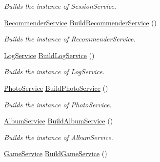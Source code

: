 \begin{DoxyCompactItemize}
\begin{DoxyCompactList}\small\item\em Builds the instance of Session\+Service. \end{DoxyCompactList}\item 
\hyperlink{classcom_1_1shephertz_1_1app42_1_1paas_1_1sdk_1_1csharp_1_1recommend_1_1_recommender_service}{Recommender\+Service} \hyperlink{classcom_1_1shephertz_1_1app42_1_1paas_1_1sdk_1_1csharp_1_1_service_a_p_i_a836d79a8d480ea93b53f6b70f61e899f}{Build\+Recommender\+Service} ()
\begin{DoxyCompactList}\small\item\em Builds the instance of Recommender\+Service. \end{DoxyCompactList}\item 
\hyperlink{classcom_1_1shephertz_1_1app42_1_1paas_1_1sdk_1_1csharp_1_1log_1_1_log_service}{Log\+Service} \hyperlink{classcom_1_1shephertz_1_1app42_1_1paas_1_1sdk_1_1csharp_1_1_service_a_p_i_a65188f775f1c72ccd4edd4dad1cd6b7e}{Build\+Log\+Service} ()
\begin{DoxyCompactList}\small\item\em Builds the instance of Log\+Service. \end{DoxyCompactList}\item 
\hyperlink{classcom_1_1shephertz_1_1app42_1_1paas_1_1sdk_1_1csharp_1_1gallery_1_1_photo_service}{Photo\+Service} \hyperlink{classcom_1_1shephertz_1_1app42_1_1paas_1_1sdk_1_1csharp_1_1_service_a_p_i_a3497410caec84d9ac88efb0968af15a0}{Build\+Photo\+Service} ()
\begin{DoxyCompactList}\small\item\em Builds the instance of Photo\+Service. \end{DoxyCompactList}\item 
\hyperlink{classcom_1_1shephertz_1_1app42_1_1paas_1_1sdk_1_1csharp_1_1gallery_1_1_album_service}{Album\+Service} \hyperlink{classcom_1_1shephertz_1_1app42_1_1paas_1_1sdk_1_1csharp_1_1_service_a_p_i_a9e164a55b12db3e5d4053a716c513859}{Build\+Album\+Service} ()
\begin{DoxyCompactList}\small\item\em Builds the instance of Album\+Service. \end{DoxyCompactList}\item 
\hyperlink{classcom_1_1shephertz_1_1app42_1_1paas_1_1sdk_1_1csharp_1_1game_1_1_game_service}{Game\+Service} \hyperlink{classcom_1_1shephertz_1_1app42_1_1paas_1_1sdk_1_1csharp_1_1_service_a_p_i_ae98660e6cf72e7557dd175f67a7c6a8d}{Build\+Game\+Service} ()

\end{DoxyCompactItemize}
